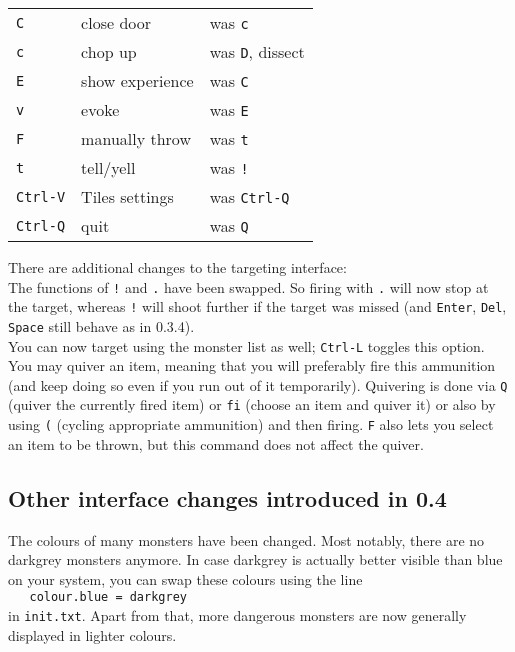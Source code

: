 \documentclass[a4paper,10pt]{article}
\newcommand{\key}[1]{{\texttt{#1}}} %
\begin{document}
\begin{center}
\begin{tabular}{lll}
\key{C}      & close door       & was \key{c}      \\
\key{c}      & chop up          & was \key{D}, dissect \\
\key{E}      & show experience  & was \key{C}      \\
\key{v}      & evoke            & was \key{E}      \\
\key{F}      & manually throw   & was \key{t}      \\
\key{t}      & tell/yell        & was \key{!}      \\
\key{Ctrl-V} & Tiles settings   & was \key{Ctrl-Q} \\
\key{Ctrl-Q} & quit             & was \key{Q}
\end{tabular}
\end{center}

There are additional changes to the targeting interface: \\
The functions of \key{!} and \key{.} have been swapped. So firing with
\key{.} will now stop at the target, whereas \key{!} will shoot further
if the target was missed (and \key{Enter}, \key{Del}, \key{Space} still
behave as in 0.3.4). \\
You can now target using the monster list as well; \key{Ctrl-L} toggles
this option.\\
You may quiver an item, meaning that you will preferably fire this
ammunition (and keep doing so even if you run out of it temporarily). 
Quivering is done via \key{Q} (quiver the currently fired item) or 
\key{fi} (choose an item and quiver it) or also by using \key{(} (cycling 
appropriate ammunition) and then firing. \key{F} also lets you select an 
item to be thrown, but this command does not affect the quiver.

\newpage

\subsection*{Other interface changes introduced in 0.4}

The colours of many monsters have been changed. Most notably, there are
no darkgrey monsters anymore. In case darkgrey is actually better visible 
than blue on your system, you can swap these colours using the line \\
\verb#   colour.blue = darkgrey #\\
in \key{init.txt}. Apart from that, more dangerous monsters are now 
generally displayed in lighter colours.
\end{document}
